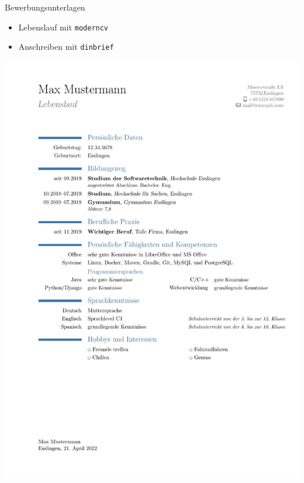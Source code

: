 \documentclass[presentation,aspectratio=169]{beamer}
\begin{document}
\begin{frame}[fragile]{Bewerbungsunterlagen}
  \begin{itemize}
    \item Lebenslauf mit \verb|moderncv|
    \item Anschreiben mit \verb|dinbrief|
  \end{itemize}
  \begin{center}
    \includegraphics[height=.7\textheight]{Lebenslauf}
    \hspace{1em}

\end{center}
\end{frame}
\end{document}
